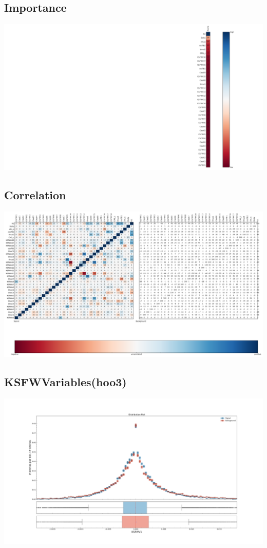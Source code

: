 \documentclass[10pt,a4paper]{article}
\begin{document}
\subsection{Importance}
\begin{center}
\includegraphics[width=1.0\textwidth]{importance.pdf}
\end{center}
\subsection{Correlation}
\begin{center}
\includegraphics[width=1.0\textwidth]{correlation_plot.pdf}
\end{center}
\subsection{KSFWVariables(hoo3)}
\begin{center}
\includegraphics[width=1.0\textwidth]{variable_7968121283635822466.pdf}
\end{center}
\end{document}

